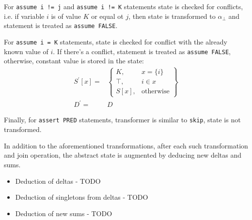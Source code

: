 For \texttt{assume i != j} and \texttt{assume i != K} statements state is checked for conflicts, i.e. if variable $i$ is of value $K$ or equal ot $j$, then state is transformed to $\alpha_\bot$ and statement is treated as \texttt{assume FALSE}.

For \texttt{assume i = K} statements, state is checked for conflict with the already known value of $i$. If there's a conflict, statement is treated as \texttt{assume FALSE}, otherwise, constant value is stored in the state:
\begin{align*}
S^\prime[x] = & \left.
	\begin{cases}
		K, & x = \{i\} \\
		\top, & i \in x \\
		S[x], & \text{otherwise}
	\end{cases}
\right\}\\
D^\prime= & D
\end{align*}


Finally, for \texttt{assert PRED} statements, transformer is similar to \texttt{skip}, state is not transformed.

In addition to the aforementioned transformations, after each such transformation and join operation, the abstract state is augmented by deducing new deltas and sums.
\begin{itemize}
\item Deduction of deltas - TODO
\item Deduction of singletons from deltas - TODO
\item Deduction of new sums - TODO
\end{itemize}